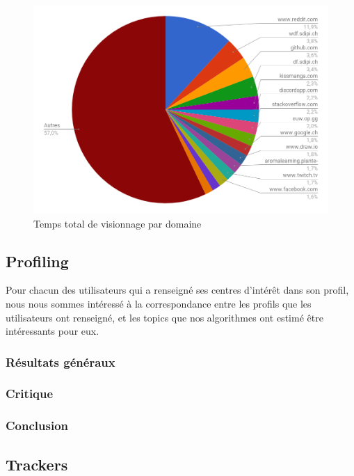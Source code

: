 	\begin{figure}[!h]
		\centering
		\includegraphics[height=0.75\textwidth]{images/results/temps_total_visionnage}
		\caption{Temps total de visionnage par domaine}
		\label{r-visionnage}
	\end{figure}

	\subsection{Profiling}

		Pour chacun des utilisateurs qui a renseigné ses centres d'intérêt dans son profil, nous nous sommes intéressé à la correspondance entre les profils que les utilisateurs ont renseigné, et les topics que nos algorithmes ont estimé être intéressants pour eux.

		\subsubsection{Résultats généraux}

		\subsubsection{Critique}

		\subsubsection{Conclusion}

	\subsection{Trackers}

